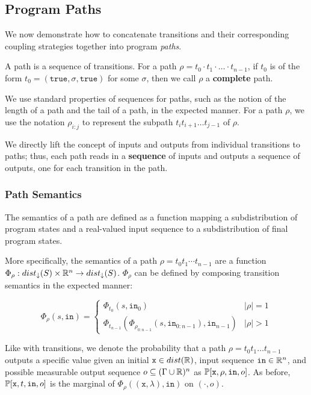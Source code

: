 
\subsection{Program Paths}

We now demonstrate how to concatenate transitions and their corresponding coupling strategies together into program \textit{paths}.

\begin{defn}[Paths]
    A path is a sequence of transitions. For a path $\rho = t_0\cdot t_1\cdot\ldots\cdot t_{n-1}$, if $t_0$ is of the form $t_0 = (\texttt{true}, \sigma, \texttt{true})$ for some $\sigma$, then we call $\rho$ a \textbf{complete} path.
\end{defn}

We use standard properties of sequences for paths, such as the notion of the length of a path and the tail of a path, in the expected manner. For a path $\rho$, we use the notation $\rho_{i:j}$ to represent the subpath  $t_i t_{i+1} \ldots t_{j-1}$ of $\rho$.

We directly lift the concept of inputs and outputs from individual transitions to paths; thus, each path reads in a \textbf{sequence} of inputs and outputs a sequence of outputs, one for each transition in the path. 

\subsubsection{Path Semantics}

The semantics of a path are defined as a function mapping a subdistribution of program states and a real-valued input sequence to a subdistribution of final program states. 

More specifically, the semantics of a path $\rho = t_0t_1\cdots t_{n-1}$ are a function $\Phi_\rho: dist_\downarrow(S)\times \mathbb{R}^n \to dist_\downarrow(S)$. $\Phi_\rho$ can be defined by composing transition semantics in the expected manner:

\[\Phi_\rho(s, \texttt{in}) = \begin{cases}
    \Phi_{t_0}(s, \texttt{in}_0)& |\rho| = 1\\
    \Phi_{t_{n-1}}(\Phi_{\rho_{0:n-1}}(s, \texttt{in}_{0:n-1}), \texttt{in}_{n-1})& |\rho| >1
\end{cases}\]


Like with transitions, we denote the probability that a path $\rho = t_0 t_1\ldots t_{n-1}$ outputs a specific value given an initial $\texttt{x}\in dist(\mathbb{R})$, input sequence $\texttt{in} \in \mathbb{R}^n$, and possible measurable output sequence $o \subseteq (\Gamma\cup\mathbb{R})^n$ as $\mathbb{P}[\texttt{x}, \rho, \texttt{in}, o]$. As before, $\mathbb{P}[\texttt{x}, t, \texttt{in}, o]$ is the marginal of $\Phi_\rho((\texttt{x}, \lambda), \texttt{in})$ on $(\cdot, o)$.

